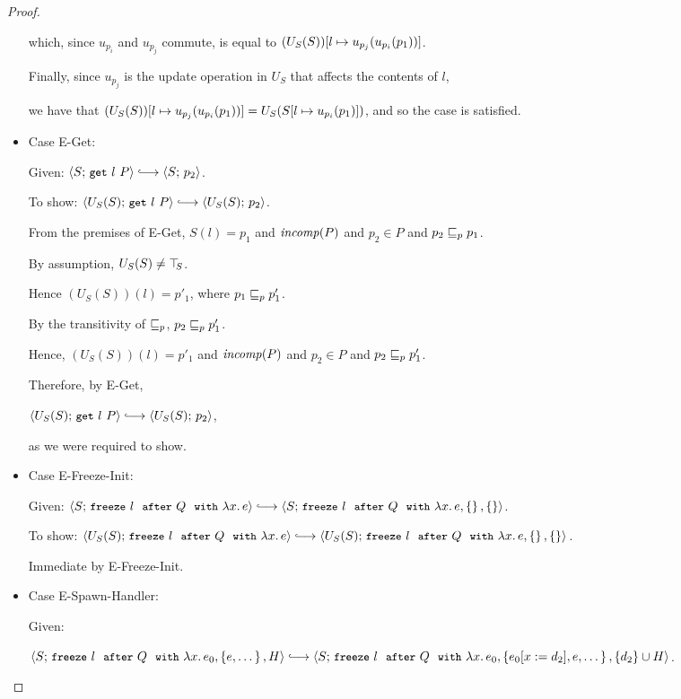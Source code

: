 \begin{proof}
\begin{itemize}
    which, since $u_{p_i}$ and $u_{p_j}$ commute, is equal to
    $(U_S(S))[l \mapsto u_{p_j}(u_{p_i}(p_1))]$.

    Finally, since $u_{p_j}$ is the update operation in $U_S$ that
    affects the contents of $l$,

    we have that $(U_S(S))[l \mapsto u_{p_j}(u_{p_i}(p_1))] =
    U_S(S[l \mapsto u_{p_i}(p_1)])$, and so the case is satisfied.

  \item Case {\sc E-Get}:

    Given: $\config{S}{\getexp{l}{P}} \parstepsto \config{S}{p_2}$.

    To show: $\config{U_S(S)}{\getexp{l}{P}} \parstepsto
    \config{U_S(S)}{p_2}$.

    From the premises of {\sc E-Get}, $S(l) = p_1$ and $\mathit{incomp}(P)$
    and $p_2 \in P$ and $p_2 \sqsubseteq_p p_1$.

    By assumption, $U_S(S) \neq \top\hspace{-0.85mm}_{S}$.

    Hence $(U_S(S))(l) = p'_1$, where $p_1 \sqsubseteq_p p'_1$.

    By the transitivity of $\sqsubseteq_p$, $p_2 \sqsubseteq_p p'_1$.

    Hence, $(U_S(S))(l) = p'_1$ and $\mathit{incomp}(P)$ and $p_2 \in P$ and
    $p_2 \sqsubseteq_p p'_1$.

    Therefore, by {\sc E-Get},

    $\config{U_S(S)}{\getexp{l}{P}} \parstepsto \config{U_S(S)}{p_2}$,

    as we were required to show.

  \item Case {\sc E-Freeze-Init}:

    Given: $\config{S}{\freezeafter{l}{Q}{\lam{x}{e}}} \parstepsto
    \\ \config{S}{\freezeafterfull{l}{Q}{\lam{x}{e}}{\setof{}}{\setof{}}}$.

    To show: $\config{U_S(S)}{\freezeafter{l}{Q}{\lam{x}{e}}}
    \parstepsto
    \\ \config{U_S(S)}{\freezeafterfull{l}{Q}{\lam{x}{e}}{\setof{}}{\setof{}}}$.

    Immediate by {\sc E-Freeze-Init}.

  \item Case {\sc E-Spawn-Handler}:

    Given:

    $\config{S}{\freezeafterfull{l}{Q}{\lam{x}{e_0}}{\setof{e,
          \dots}}{H}} \parstepsto
    \\ \config{S}{\freezeafterfull{l}{Q}{\lam{x}{e_0}}{\setof{\subst{e_0}{x}{d_2},
          e, \dots}} {\{d_2\}\cup H}}$.


\end{itemize}
\end{proof}
